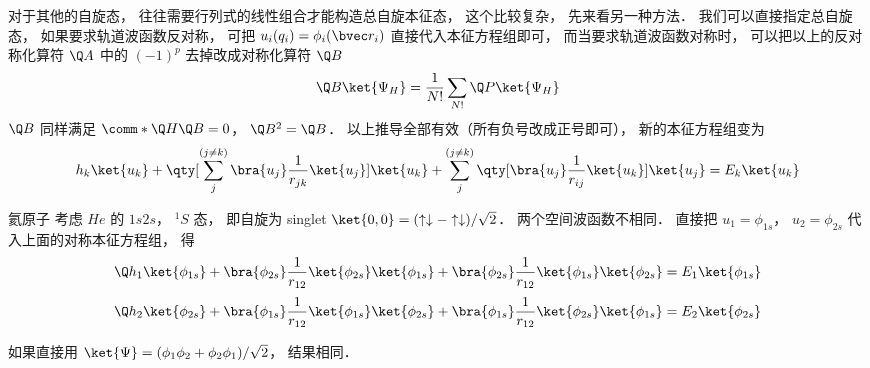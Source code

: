 对于其他的自旋态， 往往需要行列式的线性组合才能构造总自旋本征态， 这个比较复杂， 先来看另一种方法． 我们可以直接指定总自旋态， 如果要求轨道波函数反对称， 可把 $u_i(q_i) = \phi_i(\bvec r_i)$ 直接代入本征方程组即可， 而当要求轨道波函数对称时， 可以把以上的反对称化算符 $\Q A$ 中的 $(-1)^p$ 去掉改成对称化算符 $\Q B$ 
\begin{equation}
\Q B \ket{\Psi_H}  = \frac{1}{N!} \sum_{N!} \Q P\ket{\Psi_H}
\end{equation}
$\Q B$ 同样满足 $\comm*{\Q H}{\Q B} = 0$，  $\Q B^2 = \Q B$．  以上推导全部有效（所有负号改成正号即可）， 新的本征方程组变为
\begin{equation}
h_k \ket{u_k} + \qty[\sum_j^{(j \ne k)} \bra{u_j} \frac{1}{r_{jk}} \ket{u_j}] \ket{u_k} + \sum_j^{(j \ne k)} \qty[\bra{u_j} \frac{1}{r_{ij}} \ket{u_k}] \ket{u_j} = E_k \ket{u_k}
\end{equation}

\begin{example}{氦原子}
考虑 $He$ 的 $1s2s$，  $^1S$ 态， 即自旋为 singlet $\ket{0,0}  = (\uparrow\downarrow  -  \uparrow\downarrow)/\sqrt 2 $．  两个空间波函数不相同． 直接把 $u_1 = \phi_{1s}$， $u_2 = \phi_{2s}$ 代入上面的对称本征方程组， 得
\begin{equation}
\Q h_1 \ket{\phi_{1s}} + \bra{\phi_{2s}} \frac{1}{r_{12}} \ket{\phi_{2s}} \ket{\phi_{1s}} + \bra{\phi_{2s}} \frac{1}{r_{12}} \ket{\phi_{1s}} \ket{\phi_{2s}} = E_1\ket{\phi_{1s}}
\end{equation}
\begin{equation}
\Q h_2 \ket{\phi_{2s}} + \bra{\phi_{1s}} \frac{1}{r_{12}} \ket{\phi_{1s}} \ket{\phi_{2s}} + \bra{\phi_{1s}} \frac{1}{r_{12}} \ket{\phi_{2s}} \ket{\phi_{1s}} = E_2 \ket{\phi_{2s}} 
\end{equation}

如果直接用 $\ket{\Psi} = (\phi_1 \phi_2 + \phi_2\phi_1)/\sqrt 2$，  结果相同．
\end{example}
 
